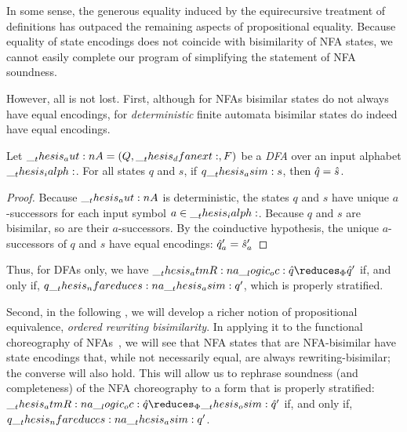   In some sense, the generous equality induced by the equirecursive treatment of definitions has outpaced the remaining aspects of propositional equality.
  Because equality of state encodings does not coincide with bisimilarity of \ac{NFA} states, we cannot easily complete our program of simplifying the statement of \ac{NFA} soundness.

However, all is not lost.
First, although for \acp{NFA} bisimilar states do not always have equal encodings, for \emph{deterministic} finite automata bisimilar states do indeed have equal encodings.
\begin{theorem}
  Let $\__thesis_aut:n {A} = (Q, \__thesis_dfanext:, F)$ be a \emph{\ac{DFA}} over an input alphabet $\__thesis_ialph:$.
  For all states $q$ and $s$, if $q \__thesis_asim: s$, then $\hat{q} = \hat{s}$.
\end{theorem}
%
\begin{proof}
  Because $\__thesis_aut:n {A}$ is deterministic, the states $q$ and $s$ have unique $a$-successors for each input symbol $a \in \__thesis_ialph:$.
  Because $q$ and $s$ are bisimilar, so are their $a$-successors.
  By the coinductive hypothesis, the unique $a$-successors of $q$ and $s$ have equal encodings: $\hat{q}'_a = \hat{s}'_a$
\end{proof}
\noindent
Thus, for \acp{DFA} only, we have $\atmR{a} \oc \defp{q} \reduces_{\orsig} \defp{q}'$ if, and only if, $q \nfareduces[a]\asim q'$, which is properly stratified.

Second, in the following , we will develop a richer notion of propositional equivalence, \emph{ordered rewriting bisimilarity}.
In applying it to the functional choreography of \acp{NFA}~, we will see that \ac{NFA} states that are \ac{NFA}-bisimilar have state encodings that, while not necessarily equal, are always rewriting-bisimilar; the converse will also hold.
This will allow us to rephrase soundness (and completeness) of the \ac{NFA} choreography to a form that is properly stratified: $\atmR{a} \oc \defp{q} \reduces_{\orsig}\osim \defp{q}'$ if, and only if, $q \nfareduces[a]\asim q'$.





